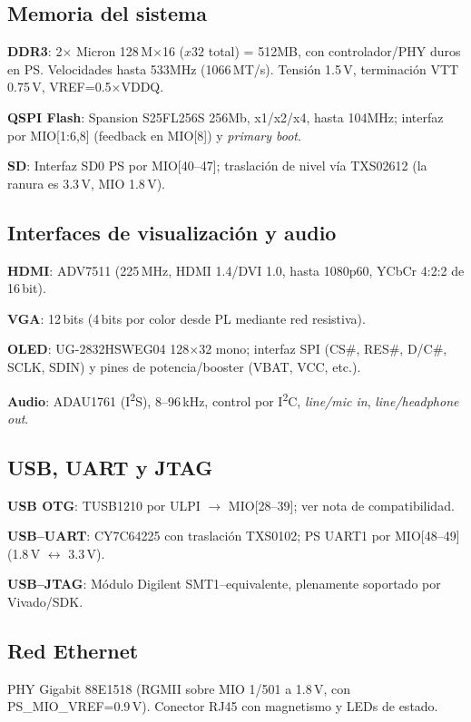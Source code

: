 \documentclass[a4paper,12pt]{article}
\begin{document}
\subsection{Memoria del sistema}
\textbf{DDR3}: 2\(\times\) Micron 128\,M\(\times\)16 (\(x32\) total) = {512}{MB}, con controlador/PHY duros en PS. Velocidades hasta {533}{MHz} (1066\,MT/s). Tensión 1.5\,V, terminación VTT 0.75\,V, VREF=0.5\(\times\)VDDQ.

\textbf{QSPI Flash}: Spansion S25FL256S {256}{Mb}, x1/x2/x4, hasta {104}{MHz}; interfaz por MIO[1:6,8] (feedback en MIO[8]) y \emph{primary boot}. 

\textbf{SD}: Interfaz SD0 PS por MIO[40–47]; traslación de nivel vía TXS02612 (la ranura es 3.3\,V, MIO 1.8\,V). 

\subsection{Interfaces de visualización y audio}
\textbf{HDMI}: ADV7511 (225\,MHz, HDMI 1.4/DVI 1.0, hasta 1080p60, YCbCr 4:2:2 de 16\,bit). 

\textbf{VGA}: 12\,bits (4\,bits por color desde PL mediante red resistiva). 

\textbf{OLED}: UG-2832HSWEG04 128\(\times\)32 mono; interfaz SPI (CS\#, RES\#, D/C\#, SCLK, SDIN) y pines de potencia/booster (VBAT, VCC, etc.). 

\textbf{Audio}: ADAU1761 (I\textsuperscript{2}S), 8–96\,kHz, control por I\textsuperscript{2}C, \emph{line/mic in}, \emph{line/headphone out}. 

\subsection{USB, UART y JTAG}
\textbf{USB OTG}: TUSB1210 por ULPI \(\rightarrow\) MIO[28–39]; ver nota de compatibilidad. 

\textbf{USB–UART}: CY7C64225 con traslación TXS0102; PS UART1 por MIO[48–49] (1.8\,V \(\leftrightarrow\) 3.3\,V). 

\textbf{USB–JTAG}: Módulo Digilent SMT1–equivalente, plenamente soportado por Vivado/SDK. 

\subsection{Red Ethernet}
PHY Gigabit 88E1518 (RGMII sobre MIO 1/501 a 1.8\,V, con PS\_MIO\_VREF=0.9\,V). Conector RJ45 con magnetismo y LEDs de estado. 
\end{document}
